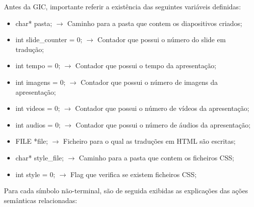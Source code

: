 \documentclass[11pt,a4paper]{report}
\begin{document}
Antes da GIC, importante referir a existência das seguintes variáveis definidas:

\begin{itemize}
	\item \hspace{0.5cm} char* pasta; $\rightarrow$ Caminho para a pasta que contem os diapositivos criados;
	\item \hspace{0.5cm} int slide\_counter = 0; $\rightarrow$ Contador que possui o número do slide em tradução;
	\item \hspace{0.5cm} int tempo = 0; $\rightarrow$ Contador que possui o tempo da apresentação;
	\item \hspace{0.5cm} int imagens = 0; $\rightarrow$ Contador que possui o número de imagens da apresentação;
	\item \hspace{0.5cm} int videos = 0; $\rightarrow$ Contador que possui o número de vídeos da apresentação;
	\item \hspace{0.5cm} int audios = 0; $\rightarrow$ Contador que possui o número de áudios da apresentação;
	\item \hspace{0.5cm} FILE *file; $\rightarrow$ Ficheiro para o qual as traduções em HTML são escritas;
	\item \hspace{0.5cm} char* style\_file; $\rightarrow$ Caminho para a pasta que contem os ficheiros CSS;
	\item \hspace{0.5cm} int style = 0; $\rightarrow$ Flag que verifica se existem ficheiros CSS;
\end{itemize}


Para cada símbolo não-terminal, são de seguida exibidas as explicações das ações semânticas relacionadas:
\end{document}
